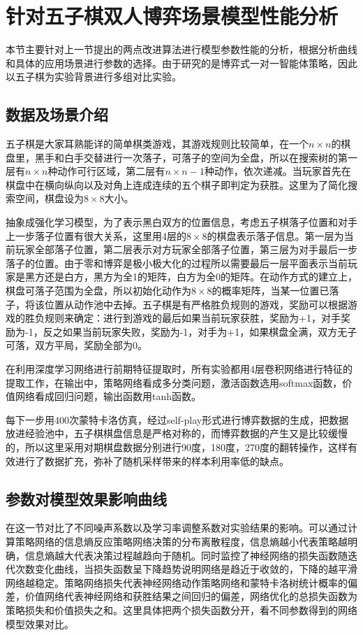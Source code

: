 \section{针对五子棋双人博弈场景模型性能分析}

本节主要针对上一节提出的两点改进算法进行模型参数性能的分析，根据分析曲线和具体的应用场景进行参数的选择。由于研究的是博弈式一对一智能体策略，因此以五子棋为实验背景进行多组对比实验。

\subsection{数据及场景介绍}
五子棋是大家耳熟能详的简单棋类游戏，其游戏规则比较简单，在一个$n \times n$的棋盘里，黑手和白手交替进行一次落子，可落子的空间为全盘，所以在搜索树的第一层有$n \times n$种动作可行区域，第二层有$n \times n-1$种动作，依次递减。当玩家首先在棋盘中在横向纵向以及对角上连成连续的五个棋子即判定为获胜。这里为了简化搜索空间，棋盘设为$8 \times 8$大小。

抽象成强化学习模型，为了表示黑白双方的位置信息，考虑五子棋落子位置和对手上一步落子位置有很大关系，这里用4层的$8 \times 8$的棋盘表示落子信息。第一层为当前玩家全部落子位置，第二层表示对方玩家全部落子位置，第三层为对手最后一步落子的位置。由于零和博弈是极小极大化的过程所以需要最后一层平面表示当前玩家是黑方还是白方，黑方为全1的矩阵，白方为全0的矩阵。在动作方式的建立上，棋盘可落子范围为全盘，所以初始化动作为$8 \times 8$的概率矩阵，当某一位置已落子，将该位置从动作池中去掉。五子棋是有严格胜负规则的游戏，奖励可以根据游戏的胜负规则来确定：进行到游戏的最后如果当前玩家获胜，奖励为+1，对手奖励为-1，反之如果当前玩家失败，奖励为-1，对手为+1，如果棋盘全满，双方无子可落，双方平局，奖励全部为0。

在利用深度学习网络进行前期特征提取时，所有实验都用4层卷积网络进行特征的提取工作，在输出中，策略网络看成多分类问题，激活函数选用softmax函数，价值网络看成回归问题，输出函数用tanh函数。

每下一步用400次蒙特卡洛仿真，经过self-play形式进行博弈数据的生成，把数据放进经验池中，五子棋棋盘信息是严格对称的，而博弈数据的产生又是比较缓慢的，所以这里采用对期棋盘数据分别进行90度，180度，270度的翻转操作，这样有效进行了数据扩充，弥补了随机采样带来的样本利用率低的缺点。

\subsection{参数对模型效果影响曲线}
在这一节对比了不同噪声系数以及学习率调整系数对实验结果的影响。可以通过计算策略网络的信息熵反应策略网络决策的分布离散程度，信息熵越小代表策略越明确，信息熵越大代表决策过程越趋向于随机。同时监控了神经网络的损失函数随迭代次数变化曲线，当损失函数呈下降趋势说明网络是趋近于收敛的，下降的越平滑网络越稳定。策略网络损失代表神经网络动作策略网络和蒙特卡洛树统计概率的偏差，价值网络代表神经网络和获胜结果之间回归的偏差，网络优化的总损失函数为策略损失和价值损失之和。这里具体把两个损失函数分开，看不同参数得到的网络模型效果对比。

